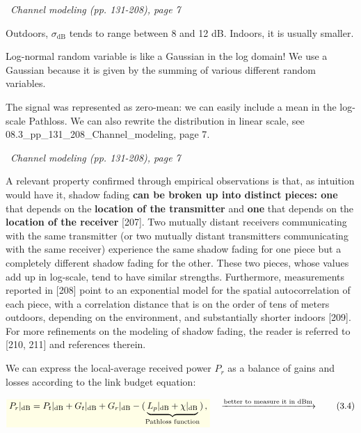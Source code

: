 \documentclass[a4paper, 12pt]{book}
\begin{document}
\begin{yellowbox}
\faBook\ \textit{Channel modeling (pp. 131-208), page 7}

Outdoors, $\sigma_{\text{dB}}$ tends to range between 8 and 12 dB. Indoors, it is usually smaller.
\end{yellowbox}

\begin{greenbar}
Log-normal random variable is like a Gaussian in the log domain! We use a Gaussian because it is given by the summing of various different random variables.
\end{greenbar}

\newpage

The signal was represented as zero-mean: we can easily include a mean in the log-scale Pathloss.
We can also rewrite the distribution in linear scale, see \textcolor{green!60!black}{08.3\_pp\_131\_208\_Channel\_modeling, page 7}.

\begin{yellowbox}
\faBook\ \textit{Channel modeling (pp. 131-208), page 7}

A relevant property confirmed through empirical observations is that, as intuition would have it, shadow fading \textbf{can be broken up into distinct pieces: one} that depends on the \textbf{location of the transmitter} and \textbf{one} that depends on the \textbf{location of the receiver} [207]. Two mutually distant receivers communicating with the same transmitter (or two mutually distant transmitters communicating with the same receiver) experience the same shadow fading for one piece but a completely different shadow fading for the other. These two pieces, whose values add up in log-scale, tend to have similar strengths. Furthermore, measurements reported in [208] point to an exponential model for the spatial autocorrelation of each piece, with a correlation distance that is on the order of tens of meters outdoors, depending on the environment, and substantially shorter indoors [209]. For more refinements on the modeling of shadow fading, the reader is referred to [210, 211] and references therein.
\end{yellowbox}

We can express the local-average received power $P_r$ as a balance of gains and losses according to the \colorbox{yellow!30}{link budget equation}:

\begin{equation}
\colorbox{yellow!10}{$\displaystyle P_r|_{\text{dB}} = P_t|_{\text{dB}} + G_t|_{\text{dB}} + G_r|_{\text{dB}} - (\underbrace{L_p|_{\text{dB}} + \chi|_{\text{dB}}}_{\text{Pathloss function}}) \,,$} \quad \xrightarrow{\text{better to measure it in dBm}} \tag{3.4}
\end{equation}
\end{document}
